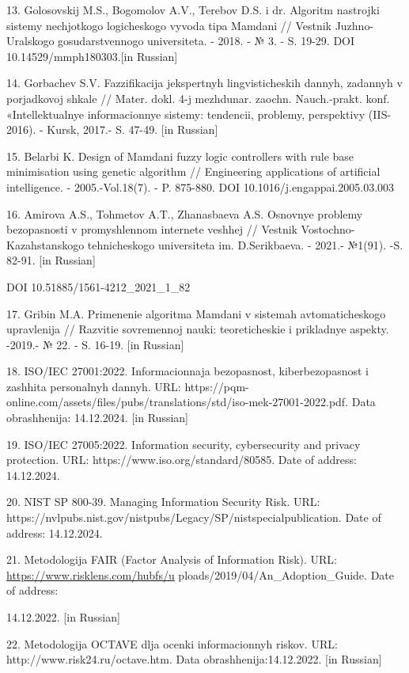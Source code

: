 \documentclass[
]{article}
\begin{document}
13. Golosovskij M.S., Bogomolov A.V., Terebov D.S. i dr. Algoritm
nastrojki sistemy nechjotkogo logicheskogo vyvoda tipa Mamdani //
Vestnik Juzhno-Ural\textquotesingle skogo gosudarstvennogo universiteta.
- 2018. - № 3. - S. 19-29. DOI 10.14529/mmph180303.{[}in Russian{]}

14. Gorbachev S.V. Fazzifikacija jekspertnyh lingvisticheskih dannyh,
zadannyh v porjadkovoj shkale // Mater. dokl. 4-j mezhdunar. zaochn.
Nauch.-prakt. konf. «Intellektual\textquotesingle nye informacionnye
sistemy: tendencii, problemy, perspektivy (IIS-2016). - Kursk, 2017.- S.
47-49. {[}in Russian{]}

15. Belarbi K. Design of Mamdani fuzzy logic controllers with rule base
minimisation using genetic algorithm // Engineering applications of
artificial intelligence. - 2005.-Vol.18(7). - P. 875-880. DOI
10.1016/j.engappai.2005.03.003

16. Amirova A.S., Tohmetov A.T., Zhanasbaeva A.S. Osnovnye problemy
bezopasnosti v promyshlennom internete veshhej // Vestnik
Vostochno-Kazahstanskogo tehnicheskogo universiteta im. D.Serikbaeva. -
2021.- №1(91). -S. 82-91. {[}in Russian{]}

DOI 10.51885/1561-4212\_2021\_1\_82

17. Gribin M.A. Primenenie algoritma Mamdani v sistemah avtomaticheskogo
upravlenija // Razvitie sovremennoj nauki: teoreticheskie i prikladnye
aspekty. -2019.- № 22. - S. 16-19. {[}in Russian{]}

18. ISO/IEC 27001:2022. Informacionnaja bezopasnost\textquotesingle,
kiberbezopasnost\textquotesingle{} i zashhita
personal\textquotesingle nyh dannyh. URL:
https://pqm-online.com/assets/files/pubs/translations/std/iso-mek-27001-2022.pdf.
Data obrashhenija: 14.12.2024. {[}in Russian{]}

19. ISO/IEC 27005:2022. Information security, cybersecurity and privacy
protection. URL: https://www.iso.org/standard/80585. Date of address:
14.12.2024.

20. NIST SP 800-39. Managing Information Security Risk. URL:
https://nvlpubs.nist.gov/nistpubs/Legacy/SP/nistspecialpublication. Date
of address: 14.12.2024.

21. Metodologija FAIR (Factor Analysis of Information Risk). URL:
\url{https://www.risklens.com/hubfs/u}
ploads/2019/04/An\_Adoption\_Guide. Date of address:

14.12.2022. {[}in Russian{]}

22. Metodologija OCTAVE dlja ocenki informacionnyh riskov. URL:
http://www.risk24.ru/octave.htm. Data obrashhenija:14.12.2022. {[}in
Russian{]}
\end{document}
